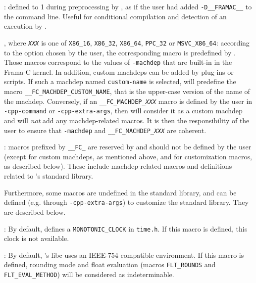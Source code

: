 \begin{description}
\item {}: defined to 1 during preprocessing by \FramaC,
as if the user had added \texttt{-D\_\_FRAMAC\_\_} to the command line. Useful
for conditional compilation and detection of an execution by \FramaC.

\item {}, where \texttt{{\em XXX}} is one of
  \texttt{X86\_16}, \texttt{X86\_32}, \texttt{X86\_64}, \texttt{PPC\_32} or
  \texttt{MSVC\_X86\_64}:
according to the option  chosen by the user,
the corresponding macro is predefined by \FramaC. Those macros correspond to
the values of \texttt{-machdep} that are built-in in the Frama-C kernel.
In addition, custom machdeps can be added
by plug-ins or scripts. If such a machdep named \texttt{custom-name}
is selected, \FramaC will predefine the macro
\texttt{\_\_FC\_MACHDEP\_CUSTOM\_NAME}, that is the upper-case version of the
name of the machdep.
Conversely, if an
\texttt{\_\_FC\_MACHDEP\_{\em XXX}} macro is defined by the user in
\texttt{-cpp-command} or \texttt{-cpp-extra-args}, then \FramaC
will consider it as a custom machdep and will {\em not} add any machdep-related
macros. It is then the responsibility of the user to ensure that
\texttt{-machdep} and \texttt{\_\_FC\_MACHDEP\_{\em XXX}} are coherent.

\item {}: macros prefixed by \texttt{\_\_FC\_} are reserved
  by \FramaC and should not be defined by the user (except for custom machdeps,
  as mentioned above, and for customization macros, as described below).
These include machdep-related macros and definitions
related to \FramaC's standard library.
\end{description}

Furthermore, some macros are undefined in the standard library, and can
be defined (e.g. through \lstinline|-cpp-extra-args|) to customize the \FramaC
standard library. They are described below.

\begin{description}
\item {}: By default, \FramaC defines
  a \lstinline|MONOTONIC_CLOCK| in \lstinline|time.h|. If this macro is defined,
  this clock is not available.
\item {}: By default, \FramaC's libc
  uses an IEEE-754 compatible environment. If this macro is defined,
  rounding mode and float evaluation
  (macros \lstinline|FLT_ROUNDS| and \lstinline|FLT_EVAL_METHOD|) will be
  considered as indeterminable.

\end{description}

